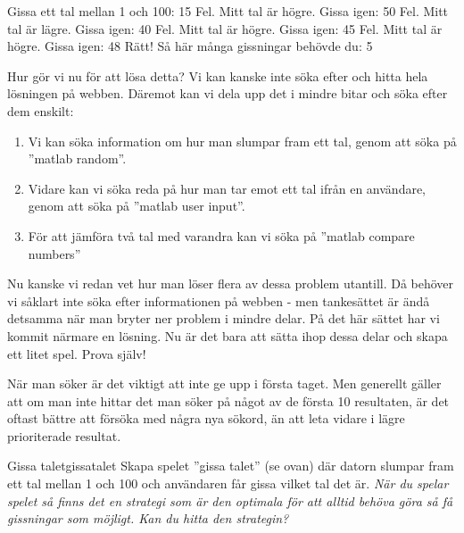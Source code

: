 \vspace{10pt}
\begin{matlab}
Gissa ett tal mellan 1 och 100: 15
Fel. Mitt tal är högre. Gissa igen: 50
Fel. Mitt tal är lägre. Gissa igen: 40
Fel. Mitt tal är högre. Gissa igen: 45
Fel. Mitt tal är högre. Gissa igen: 48
Rätt! Så här många gissningar behövde du:
5
\end{matlab}

Hur gör vi nu för att lösa detta? Vi kan kanske inte söka efter och hitta hela lösningen på webben. Däremot kan vi dela upp det i mindre bitar och söka efter dem enskilt:
\begin{enumerate}
	\item Vi kan söka information om hur man slumpar fram ett tal, genom att söka på ''matlab random''.
	\item Vidare kan vi söka reda på hur man tar emot ett tal ifrån en användare, genom att söka på ''matlab user input''.
	\item För att jämföra två tal med varandra kan vi söka på ''matlab compare numbers''
\end{enumerate}

Nu kanske vi redan vet hur man löser flera av dessa problem utantill. Då behöver vi såklart inte söka efter informationen på webben - men tankesättet är ändå detsamma när man bryter ner problem i mindre delar. På det här sättet har vi kommit närmare en lösning. Nu är det bara att sätta ihop dessa delar och skapa ett litet spel. Prova själv!

När man söker är det viktigt att inte ge upp i första taget. Men generellt gäller att om man inte hittar det man söker på något av de första 10 resultaten, är det oftast bättre att försöka med några nya sökord, än att leta vidare i lägre prioriterade resultat.


\begin{matteovning}{Gissa talet}{gissatalet}
Skapa spelet ''gissa talet'' (se ovan) där datorn slumpar fram ett tal mellan 1 och 100 och användaren får gissa vilket tal det är.
\newline
\newline
\emph{När du spelar spelet så finns det en strategi som är den optimala för att alltid behöva göra så få gissningar som möjligt. Kan du hitta den strategin?}
\end{matteovning}

